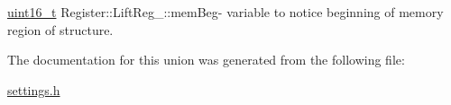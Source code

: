 \mbox{\label{unionRegister_1_1LiftReg___a300648c78c7d8c50321d1c3da48ba591}} 
{\footnotesize\ttfamily \mbox{\hyperlink{settings_8h_a017dd44e68049ffdd31500a8cd01ba68}{uint16\+\_\+t}} Register\+::\+Lift\+Reg\+\_\+\+::\texorpdfstring{mem\+Beg}{memBeg}}- variable to notice beginning of memory region of structure.



The documentation for this union was generated from the following file\+:\begin{DoxyCompactItemize}
\item 
\mbox{\hyperlink{settings_8h}{settings.\+h}}\end{DoxyCompactItemize}
\newpage